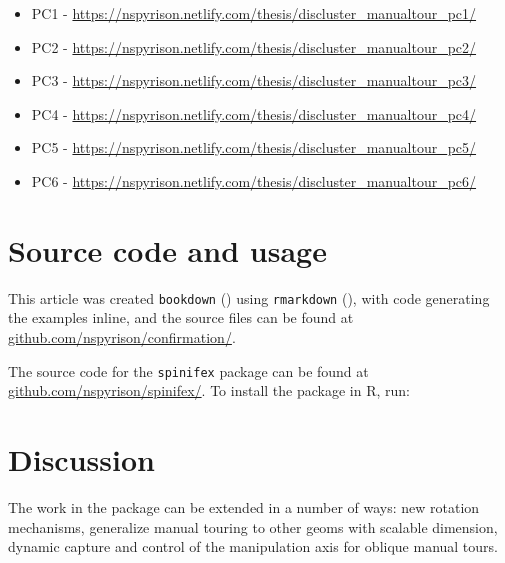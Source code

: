 \documentclass{monashthesis}
\begin{document}
\begin{itemize}
\tightlist
\item
  PC1 - \url{https://nspyrison.netlify.com/thesis/discluster_manualtour_pc1/}
\item
  PC2 - \url{https://nspyrison.netlify.com/thesis/discluster_manualtour_pc2/}
\item
  PC3 - \url{https://nspyrison.netlify.com/thesis/discluster_manualtour_pc3/}
\item
  PC4 - \url{https://nspyrison.netlify.com/thesis/discluster_manualtour_pc4/}
\item
  PC5 - \url{https://nspyrison.netlify.com/thesis/discluster_manualtour_pc5/}
\item
  PC6 - \url{https://nspyrison.netlify.com/thesis/discluster_manualtour_pc6/}
\end{itemize}

\hypertarget{source-code-and-usage}{%
\section{Source code and usage}\label{source-code-and-usage}}

This article was created \texttt{bookdown} (\textcite{xie_bookdown:_2016}) using \texttt{rmarkdown} (\textcite{xie_r_2018}), with code generating the examples inline, and the source files can be found at \href{https://github.com/nspyrison/confirmation/}{github.com/nspyrison/confirmation/}.

The source code for the \texttt{spinifex} package can be found at \href{https://github.com/nspyrison/spinifex/}{github.com/nspyrison/spinifex/}. To install the package in R, run:

\begin{Shaded}
\begin{Highlighting}[]
\OperatorTok{::}\NormalTok{(}\NormalTok{)}
\end{Highlighting}
\end{Shaded}

\hypertarget{discussion}{%
\section{Discussion}\label{discussion}}

The work in the package can be extended in a number of ways: new rotation mechanisms, generalize manual touring to other geoms with scalable dimension, dynamic capture and control of the manipulation axis for oblique manual tours.
\end{document}
